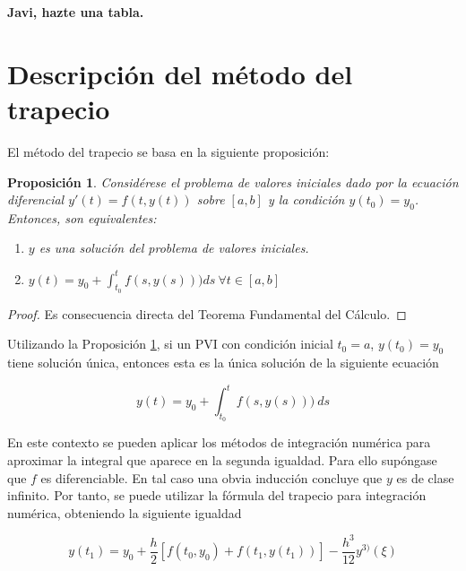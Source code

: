 \documentclass{article}
\theoremstyle{theorem-style}  %
\newtheorem{proposition}[theorem]{Proposición}
\theoremstyle{definition}
\theoremstyle{example-style}
\begin{document}
	\textbf{Javi, hazte una tabla.}


\section{Descripción del método del trapecio}

	El método del trapecio se basa en la siguiente proposición:

	\begin{proposition} \label{prop:sol-eq}
		Considérese el problema de valores iniciales dado por la ecuación diferencial $y'(t) = f(t,y(t))$ sobre $[a,b]$ y la condición $y(t_0) = y_0$.  Entonces, son equivalentes:
		\begin{enumerate}
			\item $y$ es una solución del problema de valores iniciales.
			\item $y(t) = y_0 + \int_{t_0}^{t} f(s,y(s))) ds \ \forall t \in [a,b]$
		\end{enumerate}
	\end{proposition}
	
	\begin{proof}
		Es consecuencia directa del Teorema Fundamental del Cálculo.
	\end{proof}

	
	Utilizando la Proposición \ref{prop:sol-eq}, si un PVI con condición inicial $t_0 = a$, $y(t_0) = y_0$ tiene solución única, entonces esta es la única solución de la siguiente ecuación
	
	\begin{equation}
		y(t)  = y_0 + \int_{t_0}^{t} f(s,y(s))) \ ds
	\end{equation}
	
	En este contexto se pueden aplicar los métodos de integración numérica para aproximar la integral que aparece en la segunda igualdad. Para ello supóngase que $f$ es diferenciable. En tal caso una obvia inducción concluye que $y$ es de clase infinito. Por tanto, se puede utilizar la fórmula del trapecio para integración numérica, obteniendo la siguiente igualdad
	
	\begin{equation} \label{eq:trapecio-igualdad}
		y(t_{1}) = y_0 + \frac{h}{2} \left[f(t_0,y_0) + f(t_1, y(t_1))\right] - \frac{h^3}{12}y^{3)}(\xi)
	\end{equation}
\end{document}
